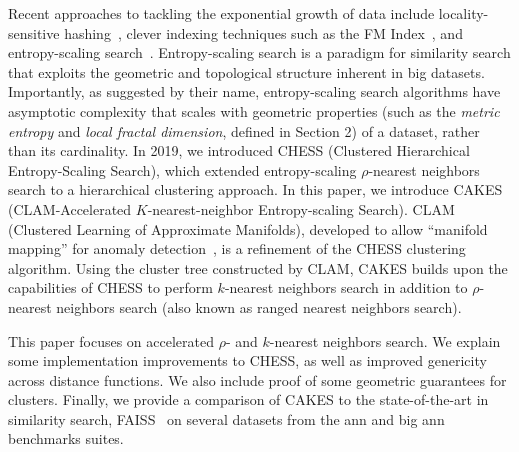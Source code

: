 Recent approaches to tackling the exponential growth of data include locality-sensitive hashing~\cite{bingham2001random}, 
clever indexing techniques such as the FM Index~\cite{ferragina2005indexing}, and entropy-scaling search~\cite{yu2015entropy, ishaq2019clustered}. 
Entropy-scaling search is a paradigm for similarity search that exploits the geometric and topological structure inherent in big datasets.
Importantly, as suggested by their name, entropy-scaling search algorithms have asymptotic complexity that scales with geometric properties (such as the 
\emph{metric entropy} and \emph{local fractal dimension}, defined in Section 2) of a dataset,
rather than its cardinality. In 2019, we introduced CHESS (Clustered Hierarchical Entropy-Scaling Search), which extended entropy-scaling $\rho$-nearest 
neighbors search to a hierarchical clustering approach. In this paper, we introduce CAKES (CLAM-Accelerated $K$-nearest-neighbor 
Entropy-scaling Search). CLAM (Clustered Learning of Approximate Manifolds), developed to allow ``manifold mapping'' for anomaly detection~\cite{ishaq2021clustered}, is a refinement of the CHESS clustering algorithm. 
Using the cluster tree constructed by CLAM, CAKES builds upon the capabilities of CHESS to perform 
$k$-nearest neighbors search in addition to $\rho$-nearest neighbors search (also known as ranged nearest neighbors search).


This paper focuses on accelerated $\rho$- and $k$-nearest neighbors search. We explain some 
implementation improvements to CHESS, as well as improved genericity across distance functions. 
We also include proof of some geometric guarantees for clusters. Finally, we provide a comparison of 
CAKES to the state-of-the-art in similarity search, FAISS~\cite{johnson2019billion} on several datasets 
from the ann and big ann benchmarks suites. 